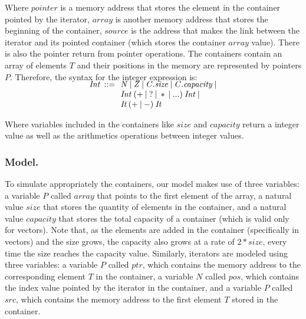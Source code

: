 \documentclass[a4paper]{llncs}
\begin{document}
Where $pointer$ is a memory address that stores the element
in the container pointed by the iterator, $array$ is another
memory address that stores the beginning of the container,
$source$ is the address that makes the link between the iterator
and its pointed container (which stores the container $array$ value).
There is also the pointer return from pointer operations.
The containers contain an array of elements $T$ and their
positions in the memory are represented by pointers $P$.
Therefore, the syntax for the integer expression is:
%
\[\begin{array}{r@{\:\:}c@{\:\:}l}
\\[-5ex]
\mathit{Int}  & ::= & \: \mathit{N} \: | \: \mathit{Z} \: | \: \mathit{C.size} \: | \: \mathit{C.capacity} \: | \\
              &     & \: \mathit{Int} \: ( + \: | \: ? \: | \: * \: | \: ...) \: \mathit{Int}  \: | \\
              &     & \: \textit{It} \: ( + \: | \: - ) \:  \textit{It}
\end{array}
\]

Where variables included in the containers
like $\mathit{size}$ and $\mathit{capacity}$ return
a integer value as well as the arithmetics
operations between integer values.



\subsubsection{Model.}

To simulate appropriately the containers, our model makes
use of three variables: a variable $P$ called $array$ that points
to the first element of the array, a natural value $size$ that stores
the quantity of elements in the container, and a natural value $capacity$
that stores the total capacity of a container (which is valid only for vectors).
Note that, as the elements are added in the container (specifically in vectors)
and the size grows, the capacity also grows at a rate of $2*size$, every time
the size reaches the capacity value. Similarly, iterators are modeled using
three variables: a variable $P$ called $ptr$, which contains the memory address
to the corresponding element $T$ in the container, a variable $N$ called $pos$,
which contains the index value pointed by the iterator in the container, and a
variable $P$ called $src$, which contains the memory address to the first
element $T$ stored in the container.
\end{document}
